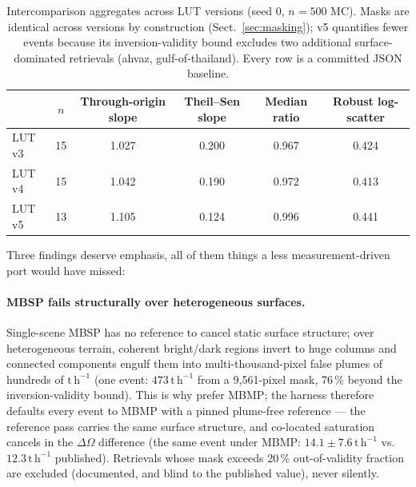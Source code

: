 \documentclass[11pt]{article}
\newcommand{\dOm}{\Delta\Omega}
\newcommand{\perh}{\ensuremath{\,\mathrm{t\,h^{-1}}}}
\begin{document}
\begin{table}[tb]
\centering\small
\caption{Intercomparison aggregates across LUT versions (seed 0, $n{=}500$
MC). Masks are identical across versions by construction
(Sect.~\ref{sec:masking}); v5 quantifies fewer events because its
inversion-validity bound excludes two additional surface-dominated
retrievals (ahvaz, gulf-of-thailand). Every row is a committed JSON
baseline.}
\label{tab:aggregates}
\begin{tabular}{@{}lccccc@{}}
\toprule
& $n$ & Through-origin slope & Theil--Sen slope & Median ratio &
Robust log-scatter \\
\midrule
LUT v3 & 15 & 1.027 & 0.200 & 0.967 & 0.424 \\
LUT v4 & 15 & 1.042 & 0.190 & 0.972 & 0.413 \\
LUT v5 & 13 & 1.105 & 0.124 & 0.996 & 0.441 \\
\bottomrule
\end{tabular}
\end{table}

Three findings deserve emphasis, all of them things a less
measurement-driven port would have missed:

\paragraph{MBSP fails structurally over heterogeneous surfaces.}
Single-scene MBSP has no reference to cancel static surface structure;
over heterogeneous terrain, coherent bright/dark regions invert to huge
columns and connected components engulf them into multi-thousand-pixel
false plumes of hundreds of $\mathrm{t\,h^{-1}}$ (one event: $473\perh$
from a 9{,}561-pixel mask, 76\,\% beyond the inversion-validity bound).
This is why \citet{varon2021} prefer MBMP; the harness therefore defaults
every event to MBMP with a pinned plume-free reference --- the reference
pass carries the same surface structure, and co-located saturation cancels
in the $\dOm$ difference (the same event under MBMP: $14.1 \pm 7.6\perh$
vs.\ $12.3\perh$ published). Retrievals whose mask exceeds 20\,\%
out-of-validity fraction
are excluded (documented, and blind to the published value), never
silently.
\end{document}
